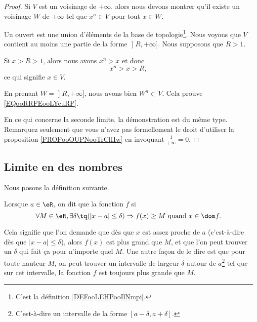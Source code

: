 \begin{proof}
    Si \( V\) est un voisinage de \( +\infty\), alors nous devons montrer qu'il existe un voisinage \( W\) de \( +\infty\) tel que \( x^n\in V\) pour tout \( x\in W\).   

    Un ouvert est une union d'éléments de la base de topologie\footnote{C'est la définition \ref{DEFooLEHPooIlNmpi}.}. Nous voyons que \( V\) contient au moins une partie de la forme \( \mathopen] R , +\infty \mathclose]\). Nous supposons que \( R>1\).

    Si \( x>R>1\), alors nous avons \( x^n>x\) et donc
    \begin{equation}
        x^n> x>R,
    \end{equation}
    ce qui signifie \( x\in V\).

    En prenant \( W=\mathopen] R , +\infty \mathclose]\), nous avons bien \( W^n\subset V\). Cela prouve \eqref{EQooRRFEooLYcuRP}.

    En ce qui concerne la seconde limite, la démonstration est du même type. Remarquez seulement que vous n'avez pas formellement le droit d'utiliser la proposition \ref{PROPooOUPNooTrClHw} en invoquant \( \frac{1}{ +\infty }=0\).
\end{proof}

\subsection{Limite en des nombres}

Nous posons la définition suivante.
\begin{definition}      \label{DefInfNombre}
Lorsque $a\in\eR$, on dit que la fonction $f$  si
\[
  \forall M\in\eR,\exists \delta\tq (| x-a |\leq \delta )\Rightarrow f(x)\geq M\text{ quand }x\in\dom f.
\]
\end{definition}
Cela signifie que l'on demande que dès que $x$ est assez proche de $a$ (c'est-à-dire dès que $| x-a |\leq\delta$), alors $f(x)$ est plus grand que $M$, et que l'on peut trouver un $\delta$ qui fait ça pour n'importe quel $M$. Une autre façon de le dire est que pour toute hauteur $M$, on peut trouver un intervalle de largeur $\delta$ autour de $a$\footnote{C'est-à-dire un intervalle de la forme $[a-\delta,a+\delta]$.} tel que sur cet intervalle, la fonction $f$ est toujours plus grande que $M$.

